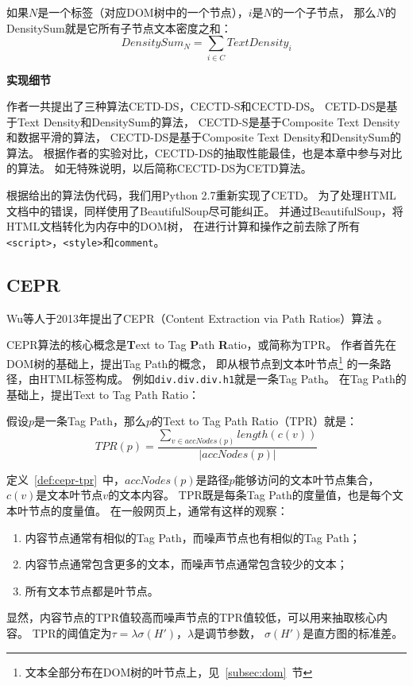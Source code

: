 \begin{definition}
\label{def:cetd-densitysum}
如果$N$是一个标签（对应DOM树中的一个节点），$i$是$N$的一个子节点，
那么$N$的DensitySum就是它所有子节点文本密度之和：
\begin{equation}
DensitySum_N = \sum_{i \in C} TextDensity_i
\end{equation}
\end{definition}

\textbf{实现细节}

作者一共提出了三种算法CETD-DS，CECTD-S和CECTD-DS。
CETD-DS是基于Text Density和DensitySum的算法，
CECTD-S是基于Composite Text Density和数据平滑的算法，
CECTD-DS是基于Composite Text Density和DensitySum的算法。
根据作者的实验对比，CECTD-DS的抽取性能最佳，也是本章中参与对比的算法。
如无特殊说明，以后简称CECTD-DS为CETD算法。

根据\cite{sun2011dom}给出的算法伪代码，我们用Python 2.7重新实现了CETD。
为了处理HTML文档中的错误，同样使用了BeautifulSoup尽可能纠正。
并通过BeautifulSoup，将HTML文档转化为内存中的DOM树，
在进行计算和操作之前去除了所有\texttt{<script>}，\texttt{<style>}和\texttt{comment}。

\subsection{CEPR}
Wu等人于2013年提出了CEPR（Content Extraction via Path Ratios）算法
。

CEPR算法的核心概念是\textbf{T}ext to Tag \textbf{P}ath \textbf{R}atio，或简称为TPR。
作者首先在DOM树的基础上，提出Tag Path的概念，
即从根节点到文本叶节点\footnote{文本全部分布在DOM树的叶节点上，见~\ref{subsec:dom}~节}
的一条路径，由HTML标签构成。
例如\texttt{div.div.div.h1}就是一条Tag Path。
在Tag Path的基础上，提出Text to Tag Path Ratio：

\begin{definition}
\label{def:cepr-tpr}
假设$p$是一条Tag Path，那么$p$的Text to Tag Path Ratio（TPR）就是：
\begin{equation}
TPR(p) = \frac{\sum_{v \in accNodes(p)}length(c(v))}{\vert accNodes(p) \vert}
\end{equation}
\end{definition}

定义~\ref{def:cepr-tpr}~中，$accNodes(p)$是路径$p$能够访问的文本叶节点集合，
$c(v)$是文本叶节点$v$的文本内容。
TPR既是每条Tag Path的度量值，也是每个文本叶节点的度量值。
在一般网页上，通常有这样的观察：
\begin{enumerate}
\item 内容节点通常有相似的Tag Path，而噪声节点也有相似的Tag Path；
\item 内容节点通常包含更多的文本，而噪声节点通常包含较少的文本；
\item 所有文本节点都是叶节点。
\end{enumerate}
显然，内容节点的TPR值较高而噪声节点的TPR值较低，可以用来抽取核心内容。
TPR的阈值定为$\tau = \lambda \sigma(H')$，$\lambda$是调节参数，
$\sigma(H')$是直方图的标准差。

